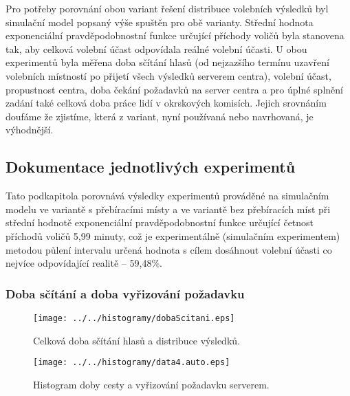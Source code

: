 \documentclass[12pt,a4paper,titlepage,final]{article}
\begin{document}
Pro potřeby porovnání obou variant řešení distribuce volebních výsledků byl simulační model \cite[str. 44]{ims} popsaný výše spuštěn pro obě varianty. Střední hodnota exponenciální pravděpodobnostní funkce \cite[str. 91]{ims} určující příchody voličů byla stanovena tak, aby celková volební účast odpovídala reálné volební účasti. U obou experimentů byla měřena doba sčítání hlasů (od nejzazšího termínu uzavření volebních místností po přijetí všech výsledků serverem centra), volební účast, propustnost centra, doba čekání požadavků na server centra a pro úplné splnění zadání také celková doba práce lidí v okrskových komisích. Jejich srovnáním doufáme že zjistíme, která z variant, nyní používaná nebo navrhovaná, je výhodnější.

\subsection{Dokumentace jednotlivých experimentů}

Tato podkapitola porovnává výsledky experimentů prováděné na simulačním modelu ve variantě s přebíracími místy a ve variantě bez přebíracích míst při střední hodnotě exponenciální pravděpodobnostní funkce určující četnost příchodů voličů 5,99 minuty, což je experimentálně (simulačním experimentem) metodou půlení intervalu určená hodnota s cílem dosáhnout volební účasti co nejvíce odpovídající realitě -- 59,48\%.

\subsubsection{Doba sčítání a doba vyřizování požadavku}

\begin{figure}[H]
\centering
\begin{minipage}{.49\textwidth}
  \centering
  \texttt{[image: ../../histogramy/dobaScitani.eps]}
  \caption{Celková doba sčítání hlasů a distribuce výsledků.}
  \label{fig:dobaScitani}
\end{minipage}
\hfill
\begin{minipage}{.49\textwidth}
  \centering
  \texttt{[image: ../../histogramy/data4.auto.eps]}
  \caption{Histogram doby cesty a vyřizování požadavku serverem.}
  \label{fig:data4}
\end{minipage}
\end{figure}
\end{document}
